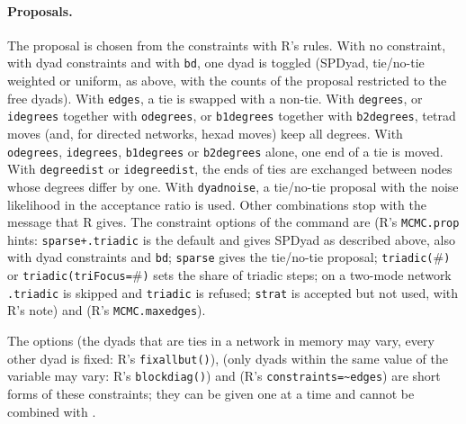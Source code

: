 \paragraph{Proposals.} The proposal is chosen from the constraints with R's rules. With no constraint, with dyad constraints and with \texttt{bd}, one dyad is toggled (SPDyad, tie/no-tie weighted or uniform, as above, with the counts of the proposal restricted to the free dyads). With \texttt{edges}, a tie is swapped with a non-tie. With \texttt{degrees}, or \texttt{idegrees} together with \texttt{odegrees}, or \texttt{b1degrees} together with \texttt{b2degrees}, tetrad moves (and, for directed networks, hexad moves) keep all degrees. With \texttt{odegrees}, \texttt{idegrees}, \texttt{b1degrees} or \texttt{b2degrees} alone, one end of a tie is moved. With \texttt{degreedist} or \texttt{idegreedist}, the ends of ties are exchanged between nodes whose degrees differ by one. With \texttt{dyadnoise}, a tie/no-tie proposal with the noise likelihood in the acceptance ratio is used. Other combinations stop with the message that R gives. The constraint options of the command are  (R's \texttt{MCMC.prop} hints: \texttt{sparse+.triadic} is the default and gives SPDyad as described above, also with dyad constraints and \texttt{bd}; \texttt{sparse} gives the tie/no-tie proposal; \texttt{triadic(}\#\texttt{)} or \texttt{triadic(triFocus=}\#\texttt{)} sets the share of triadic steps; on a two-mode network \texttt{.triadic} is skipped and \texttt{triadic} is refused; \texttt{strat} is accepted but not used, with R's note) and  (R's \texttt{MCMC.maxedges}).

The options  (the dyads that are ties in a network in memory may vary, every other dyad is fixed: R's \texttt{fixallbut()}),  (only dyads within the same value of the variable may vary: R's \texttt{blockdiag()}) and  (R's \texttt{constraints=\textasciitilde edges}) are short forms of these constraints; they can be given one at a time and cannot be combined with .


